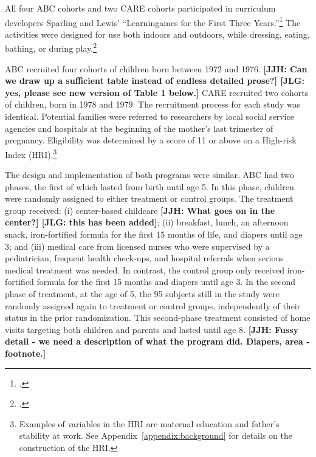 All four ABC cohorts and two CARE cohorts participated in curriculum developers Sparling and Lewis' ``Learningames for the First Three Years.''\footnote{ \citet{Sparling_Lewis_1979_BOOKLearninggamesFirstThree}.} The activities were designed for use both indoors and outdoors, while dressing, eating, bathing, or during play.\footnote{\citet{Ramey_Campbell_1979_SR, Ramey_1981_Modification,Sparling_Lewis_1979_BOOKLearninggamesFirstThree}.}

ABC recruited four cohorts of children born between 1972 and 1976. \textbf{[JJH: Can we draw up a sufficient table instead of endless detailed prose?] [JLG: yes, please see new version of Table 1 below.]} CARE recruited two cohorts of children, born in 1978 and 1979. The recruitment process for each study was identical. Potential families were referred to researchers by local social service agencies and hospitals at the beginning of the mother's last trimester of pregnancy. Eligibility was determined by a score of 11 or above on a High-risk Index (HRI).\footnote{Examples of variables in the HRI are maternal education and father's stability at work. See Appendix~\ref{appendix:background} for details on the construction of the HRI.}

The design and implementation of both programs were similar. ABC had two phases, the first of which lasted from birth until age 5. In this phase, children were randomly assigned to either treatment or control groups. The treatment group received: (i) center-based childcare \textbf{[JJH: What goes on in the center?] [JLG: this has been added]}; (ii) breakfast, lunch, an afternoon snack, iron-fortified formula for the first 15 months of life, and diapers until age 3; and (iii) medical care from licensed nurses who were supervised by a pediatrician, frequent health check-ups, and hospital referrals when serious medical treatment was needed. In contrast, the control group only received iron-fortified formula for the first 15 months and diapers until age 3. In the second phase of treatment, at the age of 5, the 95 subjects still in the study were randomly assigned again to treatment or control groups, independently of their status in the prior randomization. This second-phase treatment consisted of home visits targeting both children and parents and lasted until age 8. \textbf{[JJH: Fussy detail - we need a description of what the program did. Diapers, area - footnote.]}

